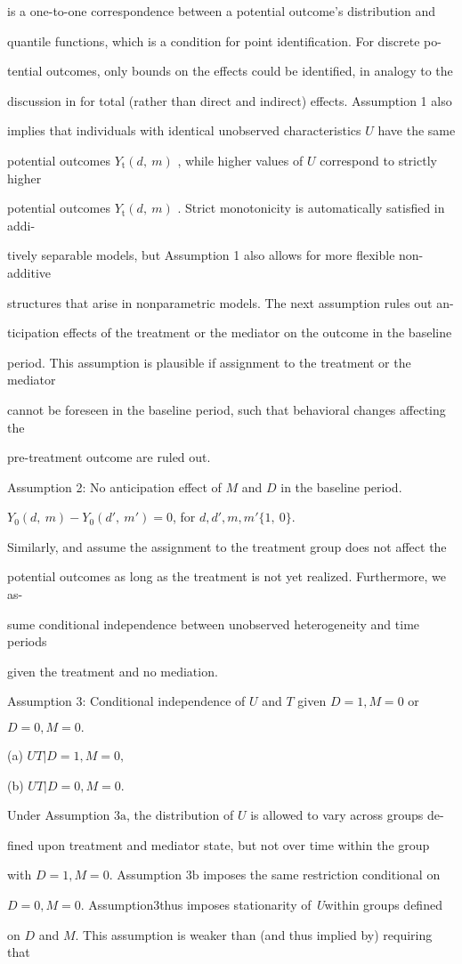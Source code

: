 \documentclass[a4paper,12pt]{article}
\begin{document}
is a one-to-one correspondence between a potential outcome’s distribution and

quantile functions, which is a condition for point identification. For discrete po-

tential outcomes, only bounds on the effects could be identified, in analogy to the

discussion in for total (rather than direct and indirect) effects. Assumption 1 also

implies that individuals with identical unobserved characteristics $U$ have the same

potential outcomes $Y_{\mathrm{t}}(d,\ m)$ , while higher values of $U$ correspond to strictly higher

potential outcomes $Y_{\mathrm{t}}(d,\ m)$ . Strict monotonicity is automatically satisfied in addi-

tively separable models, but Assumption 1 also allows for more flexible non-additive

structures that arise in nonparametric models. The next assumption rules out an-

ticipation effects of the treatment or the mediator on the outcome in the baseline

period. This assumption is plausible if assignment to the treatment or the mediator

cannot be foreseen in the baseline period, such that behavioral changes affecting the

pre-treatment outcome are ruled out.

Assumption 2: No anticipation effect of $M$ and $D$ in the baseline period.

$Y_{0}(d,\ m)-Y_{0}(d',\ m')=0$, for $d, d', m, m'\{1,\ 0\}.$

Similarly, and assume the assignment to the treatment group does not affect the

potential outcomes as long as the treatment is not yet realized. Furthermore, we as-

sume conditional independence between unobserved heterogeneity and time periods

given the treatment and no mediation.

Assumption 3: Conditional independence of $U$ and $T$ given $D = 1, M = 0$ or

$D=0, M=0.$

(a) $UT|D=1, M=0,$

(b) $UT|D=0, M=0.$

Under Assumption $3\mathrm{a}$, the distribution of $U$ is allowed to vary across groups de-

fined upon treatment and mediator state, but not over time within the group

with $D = 1, M = 0$. Assumption $3\mathrm{b}$ imposes the same restriction conditional on

$D=0, M=0$. Assumption3thus imposes stationarity of {\it U}within groups defined

on $D$ and $M$. This assumption is weaker than (and thus implied by) requiring that
\end{document}
